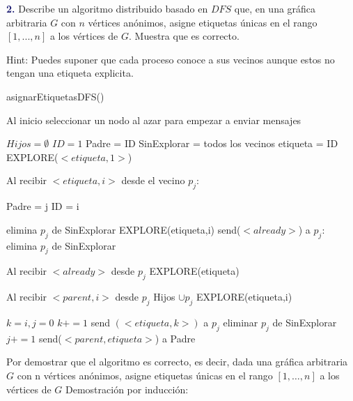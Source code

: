 \newpage
\textbf{\textcolor{MidnightBlue}{2.}}
Describe un algoritmo distribuido basado en $DFS$ que, en una gráfica arbitraria $G$ con $n$ vértices anónimos, asigne etiquetas únicas en el rango $[1, . . . , n]$ a los vértices de $G$. Muestra que es correcto.

Hint: Puedes suponer que cada proceso conoce a sus vecinos aunque estos no tengan una etiqueta explicita.

\begin{algorithm}
    \caption{asignarEtiquetasDFS()}
    \begin{algorithmic}[1]

    \State Al inicio seleccionar un nodo al azar para empezar a enviar mensajes

    \State $Hijos = \emptyset$
    \State $ID = 1$
    \State Padre = ID
    \State SinExplorar = todos los vecinos
    \State etiqueta = ID
    \State EXPLORE($<etiqueta,1>$)

    \State Al recibir $<etiqueta,i>$ desde el vecino $p_j$:
    
        \State Padre = j
        \State ID = i

        \State elimina $p_j$ de SinExplorar
        \State EXPLORE(etiqueta,i)
    \Else
        \State send($<already>$) a $p_j$:
        \State elimina $p_j$ de SinExplorar
    \EndIf
    
    \State Al recibir $<already>$ desde $p_j$
        \State EXPLORE(etiqueta)
    
    \State Al recibir $<parent,i>$ desde $p_j$
    \State Hijos $\cup {p_j}$
    \State EXPLORE(etiqueta,i)

    
        \State $k=i,j=0$
                \State $k+=1$
                \State send $(<etiqueta,k>)$ a $p_j$
                \State eliminar $p_j$ de SinExplorar
                \State $j+=1$
            \EndWhile
        \Else  
                \State send($<parent, etiqueta>$) a Padre
            \EndIf
        \EndIf
    \EndProcedure
    \end{algorithmic}
    \end{algorithm}
    
Por demostrar que el algoritmo es correcto, es decir, dada una gráfica arbitraria $G$ con n vértices anónimos, asigne etiquetas únicas en el rango $[1,\dots, n]$ a los vértices de $G$
Demostración por inducción:

